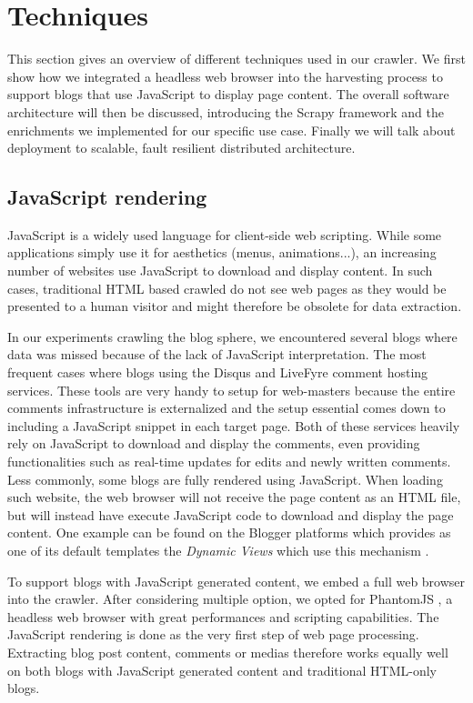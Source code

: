 \section{Techniques}

This section gives an overview of different techniques used in our crawler. We first show how we integrated a headless web browser into the harvesting process to support blogs that use JavaScript to display page content. The overall software architecture will then be discussed, introducing the Scrapy framework and the enrichments we implemented for our specific use case. Finally we will talk about deployment to scalable, fault resilient distributed architecture.


\subsection{JavaScript rendering}
JavaScript is a widely used language for client-side web scripting. While some applications simply use it for aesthetics (menus, animations...), an increasing number of websites use JavaScript to download and display content. In such cases, traditional HTML based crawled do not see web pages as they would be presented to a human visitor and might therefore be obsolete for data extraction.

In our experiments crawling the blog sphere, we encountered several blogs where data was missed because of the lack of JavaScript interpretation. The most frequent cases where blogs using the Disqus \cite{disqus2013} and LiveFyre \cite{livefyre2013} comment hosting services. These tools are very handy to setup for web-masters because the entire comments infrastructure is externalized and the setup essential comes down to including a JavaScript snippet in each target page. Both of these services heavily rely on JavaScript to download and display the comments, even providing functionalities such as real-time updates for edits and newly written comments. Less commonly, some blogs are fully rendered using JavaScript. When loading such website, the web browser will not receive the page content as an HTML file, but will instead have execute JavaScript code to download and display the page content. One example can be found on the Blogger platforms which provides as one of its default templates the \emph{Dynamic Views} which use this mechanism \cite{antinharasymiv2011}.

To support blogs with JavaScript generated content, we embed a full web browser into the crawler. After considering multiple option, we opted for PhantomJS \cite{phantomjs2013}, a headless web browser with great performances and scripting capabilities. The JavaScript rendering is done as the very first step of web page processing. Extracting blog post content, comments or medias therefore works equally well on both blogs with JavaScript generated content and traditional HTML-only blogs.

